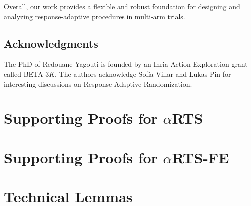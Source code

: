 \documentclass[11pt]{article}
\theoremstyle{plain}
\theoremstyle{definition}
\begin{document}
	Overall, our work provides a flexible and robust foundation for designing and analyzing response-adaptive procedures in multi-arm trials.

	\subsection*{Acknowledgments}
		The PhD of Redouane Yagouti is founded by an Inria Action Exploration grant called BETA-3$K$. The authors acknowledge Sof\'ia Villar and Lukas Pin for interesting discussions on Response Adaptive Randomization.

	
	

	\newpage
	\begin{appendix}
		\section{Supporting Proofs for $\alpha$RTS}\label{appnA}
		

		\section{Supporting Proofs for $\alpha$RTS-FE}\label{appnB}
		

		\section{Technical Lemmas}\label{appnC}
		
	\end{appendix}
\end{document}
